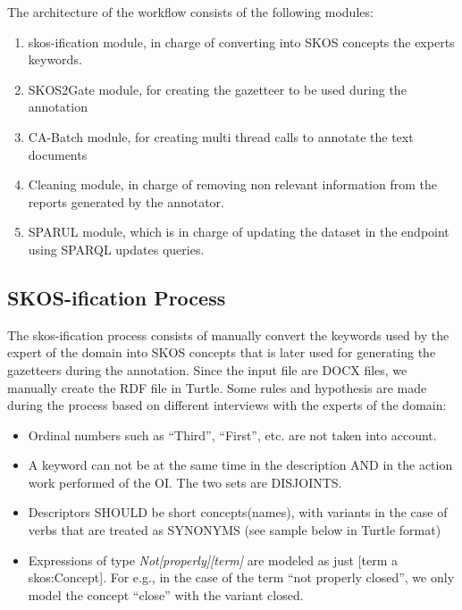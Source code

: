 \documentclass[a4paper,english,submission]{rnti}  %
\begin{document}
The architecture of the workflow consists of the following modules:
\begin{enumerate}
\item skos-ification module, in charge of converting into SKOS concepts the experts keywords.
\item SKOS2Gate module, for creating the gazetteer to be used during the annotation
\item CA-Batch module, for creating multi thread calls to annotate the text documents
\item Cleaning module, in charge of removing non relevant information from the reports generated by the annotator.
\item SPARUL module, which is in charge of updating the dataset in the endpoint using SPARQL updates queries.  
\end{enumerate}
 

\subsection{SKOS-ification Process}
\label{sec:skosification}

The skos-ification process consists of manually convert the keywords used by the expert of the domain into SKOS concepts that is later used for generating the gazetteers during the annotation. Since the input file are DOCX files, we manually create the RDF file in Turtle. Some rules and hypothesis are made during the process based on different interviews with the experts of the domain:

\begin{itemize}
\item Ordinal numbers such as ``Third'', ``First'', etc. are not taken into account. 
\item A keyword can not be at the same time in the description AND in the action work performed of the OI. The two sets are DISJOINTS.
\item Descriptors SHOULD be short concepts(names), with variants in the case of verbs that are treated as SYNONYMS (see sample below in Turtle format)
\item Expressions of type \textit{Not[properly][term]} are modeled as just [term a skos:Concept].
For e.g.,  in the case of the term ``not properly closed'', we only model the concept ``close'' with the variant closed. 
\end{itemize}
\end{document}
